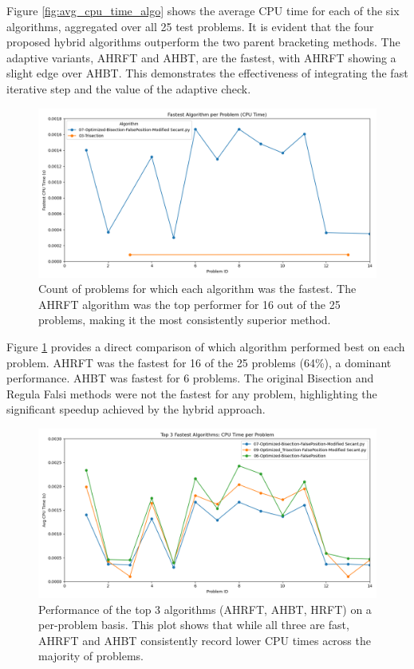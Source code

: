\documentclass[reprint, amsmath, amssymb, aps, prl]{revtex4-2}
\begin{document}
\begin{table}[h!]
\begin{ruledtabular}
Figure \ref{fig:avg_cpu_time_algo} shows the average CPU time for each of the six algorithms, aggregated over all 25 test problems. It is evident that the four proposed hybrid algorithms outperform the two parent bracketing methods. The adaptive variants, AHRFT and AHBT, are the fastest, with AHRFT showing a slight edge over AHBT. This demonstrates the effectiveness of integrating the fast iterative step and the value of the adaptive check.

\begin{figure}[h!]
    \includegraphics[width=\linewidth]{fastest_algorithm_per_problem_lineplot.png}
    \caption{Count of problems for which each algorithm was the fastest. The AHRFT algorithm was the top performer for 16 out of the 25 problems, making it the most consistently superior method.}
    \label{fig:fastest_counts}
\end{figure}

Figure \ref{fig:fastest_counts} provides a direct comparison of which algorithm performed best on each problem. AHRFT was the fastest for 16 of the 25 problems (64\%), a dominant performance. AHBT was fastest for 6 problems. The original Bisection and Regula Falsi methods were not the fastest for any problem, highlighting the significant speedup achieved by the hybrid approach.

\begin{figure}[h!]
    \includegraphics[width=\linewidth]{top3_fastest_algorithms_lineplot.png}
    \caption{Performance of the top 3 algorithms (AHRFT, AHBT, HRFT) on a per-problem basis. This plot shows that while all three are fast, AHRFT and AHBT consistently record lower CPU times across the majority of problems.}
    \label{fig:top3_performance}
\end{figure}


\end{ruledtabular}
\end{table}
\end{document}
